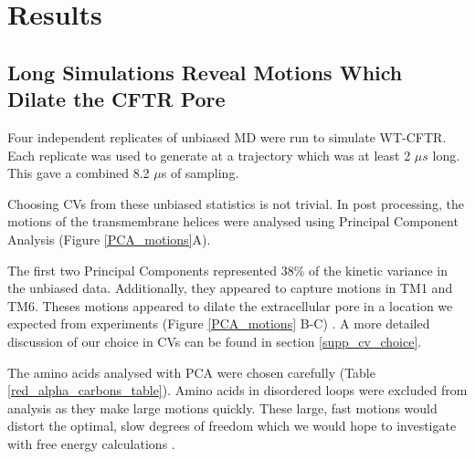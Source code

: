 \section{Results}

\subsection{Long Simulations Reveal Motions Which Dilate the CFTR Pore}
Four independent replicates of unbiased MD were run to simulate WT-CFTR. Each replicate was used to generate at a trajectory which was at least 2 $\mu s$ long. This gave a combined 8.2 $\mu$s of sampling. 

Choosing CVs from these unbiased statistics is not trivial. In post processing, the motions of the transmembrane helices were analysed using Principal Component Analysis \cite{pearson1901, hotelling1936} (Figure \ref{PCA_motions}A). 

The first two Principal Components represented 38\% of the kinetic variance in the unbiased data. Additionally, they appeared to capture motions in TM1 and TM6. Theses motions appeared to dilate the extracellular pore in a location we expected from experiments (Figure \ref{PCA_motions} B-C) \cite{linsdell2018, negoda2018, negoda2019}. A more detailed discussion of our choice in CVs can be found in section \ref{supp_cv_choice}. 

The amino acids analysed with PCA were chosen carefully (Table \ref{red_alpha_carbons_table}). Amino acids in disordered loops were excluded from analysis as they make large motions quickly. These large, fast motions would distort the optimal, slow degrees of freedom which we would hope to investigate with free energy calculations \cite{noe2001}. 

